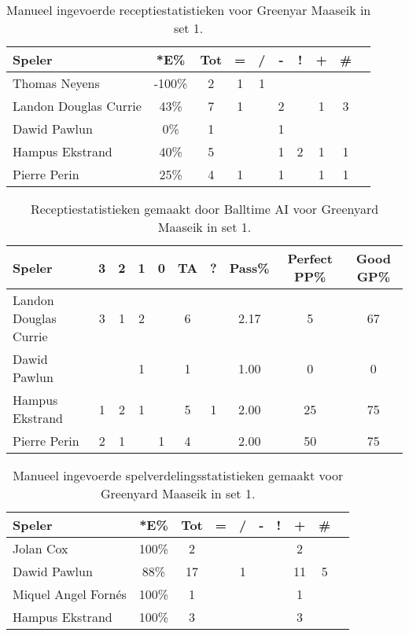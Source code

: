 
\begin{table}[ht!]
    \centering
    \scriptsize
    \begin{tabular}{|l|c|c|c|c|c|c|c|c|c|} \hline
        \textbf{Speler} & *E\% & Tot & = & / & - & ! & + & \# \\ \hline
        Thomas Neyens & -100\% & 2 & 1 & 1 &  &  & & \\
        Landon Douglas Currie & 43\% & 7 & 1 &  & 2 & & 1 & 3 \\ 
        Dawid Pawlun & 0\% & 1 &  &  & 1 &  &  & \\ 
        Hampus Ekstrand & 40\% & 5 &  &  & 1 & 2 & 1 & 1 \\ 
        Pierre Perin & 25\% & 4 & 1 &  & 1 & & 1 & 1 \\ \hline
    \end{tabular}
    \caption[Manueel ingevoerde receptiestatistieken voor Greenyard Maaseik in set 1]{\label{tab:PL3ReceiveMaaseikMan1}Manueel ingevoerde receptiestatistieken voor Greenyar Maaseik in set 1.}
\end{table}

\begin{table}[ht!]
  \centering
  \scriptsize
    \begin{tabular}{|l|c|c|c|c|c|c|c|c|c|} \hline
    \textbf{Speler} & 3 & 2 & 1 & 0 & TA & ? & Pass\% & Perfect PP\% & Good GP\% \\ \hline
    Landon Douglas Currie & 3 & 1 & 2 &   & 6 &  & 2.17 & 5 & 67 \\
    Dawid Pawlun &  &  & 1 &  & 1 &  & 1.00 & 0 & 0 \\
    Hampus Ekstrand & 1 & 2 & 1 & & 5 & 1 & 2.00 & 25 & 75 \\
    Pierre Perin & 2 & 1 &  & 1 & 4 & & 2.00 & 50 & 75 \\  \hline
  \end{tabular}
  \caption[Receptiestatistieken gemaakt door Balltime AI voor Greenyard Maaseik in set 1]{\label{tab:PL3ReceiveMaaseikAI1}Receptiestatistieken gemaakt door Balltime AI voor Greenyard Maaseik in set 1.}
\end{table}


\begin{table}[ht!]
    \centering
    \scriptsize
    \begin{tabular}{|l|c|c|c|c|c|c|c|c|c|} \hline
        \textbf{Speler} & *E\% & Tot & = & / & - & ! & + & \# \\ \hline
        Jolan Cox & 100\% & 2 &  &  &  &  & 2 &  \\ 
        Dawid Pawlun & 88\% & 17 &  & 1 &  &  & 11 & 5 \\ 
        Miquel Angel Fornés & 100\% & 1 &  &  &  &  & 1 &  \\ 
        Hampus Ekstrand & 100\% & 3 &  &  &  &  & 3 &  \\ \hline
    \end{tabular}
    \caption[Manueel ingevoerde spelverdelingsstatistieken gemaakt voor Greenyard Maaseik in set 1]{\label{tab:PL3SetMaaseikMan1}Manueel ingevoerde spelverdelingsstatistieken gemaakt voor Greenyard Maaseik in set 1.}
\end{table}


